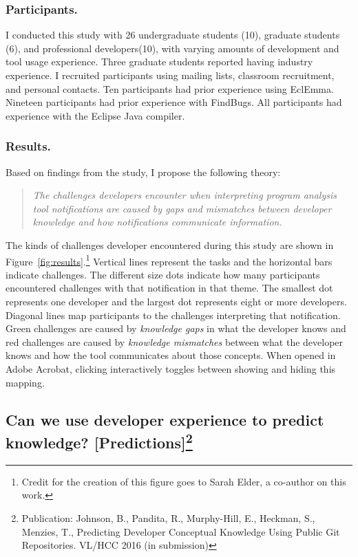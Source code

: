\documentclass{llncs}
\begin{document}
\subsubsection{Participants.} I conducted this study with 26 undergraduate students (10), graduate students (6), and professional developers(10), with varying amounts of development and tool usage experience. Three graduate students reported having industry experience. I recruited participants using mailing lists, classroom recruitment, and personal contacts.
Ten participants had prior experience using EclEmma. Nineteen participants had prior experience with FindBugs. All participants had experience with the Eclipse Java compiler.

\subsubsection{Results.} 
Based on findings from the study, I propose the following theory:

\begin{quotation}
	\noindent
	\emph{The challenges developers encounter when interpreting program analysis tool notifications are caused by gaps and mismatches between developer knowledge and how notifications communicate information.}
\end{quotation}

The kinds of challenges developer encountered during this study are shown in  Figure~\ref{fig:results}.\footnote{Credit for the creation of this figure goes to Sarah Elder, a co-author on this work.}
Vertical lines represent the tasks and the horizontal bars indicate challenges.
The different size dots indicate how many participants encountered challenges with that notification in that theme. 
The smallest dot represents one developer and the largest dot represents eight or more developers.
Diagonal lines map participants to the challenges interpreting that notification. Green challenges are caused by \emph{knowledge gaps} in what the developer knows and red challenges are caused by \emph{knowledge mismatches} between what the developer knows and how the tool communicates about those concepts.
\setlength\fboxsep{1pt}
When opened in Adobe Acrobat, clicking  
interactively toggles between showing and hiding this mapping.

\subsection{Can we use developer experience to predict knowledge? [Predictions]\protect\footnote{Publication: Johnson, B., Pandita, R., Murphy-Hill, E., Heckman, S., Menzies, T., Predicting Developer Conceptual Knowledge Using Public Git Repositories. VL/HCC 2016 (in submission)}}\label{subsec:s3}
\end{document}
